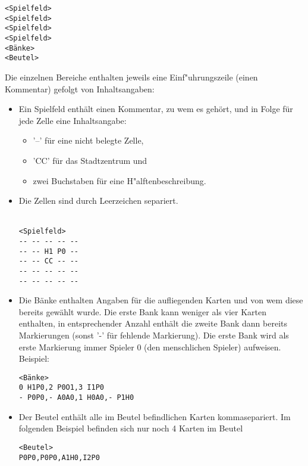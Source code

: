 \begin{addmargin}[50pt]{0pt}
\begin{samepage}
\verb|<Spielfeld>|
\\ \verb|<Spielfeld>|
\\ \verb|<Spielfeld>|
\\ \verb|<Spielfeld>|
\\ \verb|<Bänke>|
\\ \verb|<Beutel>|\\
\end{samepage}
\end{addmargin}

Die einzelnen Bereiche enthalten jeweils eine Einf"uhrungszeile (einen Kommentar) gefolgt von Inhaltsangaben:
\begin{itemize}
	\item Ein Spielfeld enthält einen Kommentar, zu wem es gehört, und in Folge für jede Zelle eine Inhaltsangabe:
	\begin{itemize}
		\item '--' für eine nicht belegte Zelle,
		\item 'CC' für das Stadtzentrum und
		\item zwei Buchstaben für eine H"alftenbeschreibung.
	\end{itemize}
	\item Die Zellen sind durch Leerzeichen separiert. \\ \newline {}\\
	\begin{addmargin}[50pt]{0pt}
	\verb|<Spielfeld>|
	\\ \verb|-- -- -- -- --|
	\\ \verb|-- -- H1 P0 --|
	\\ \verb|-- -- CC -- --|
	\\ \verb|-- -- -- -- --|
	\\ \verb|-- -- -- -- --|\\
	\end{addmargin}
	\item Die Bänke enthalten Angaben für die aufliegenden Karten und von wem diese bereits gewählt wurde. Die erste Bank kann weniger als vier Karten enthalten, in entsprechender Anzahl enthält die zweite Bank dann bereits Markierungen (sonst '-' für fehlende Markierung). Die erste Bank wird als erste Markierung immer Spieler 0 (den menschlichen Spieler) aufweisen. Beispiel:
	\begin{addmargin}[50pt]{0pt}
	\verb|<Bänke>|
  \\ \verb|0 H1P0,2 P0O1,3 I1P0|
  \\ \verb|- P0P0,- A0A0,1 H0A0,- P1H0|
  \end{addmargin}
  \item Der Beutel enthält alle im Beutel befindlichen Karten kommasepariert. Im folgenden Beispiel befinden sich nur noch 4 Karten im Beutel
  \begin{addmargin}[50pt]{0pt}
  \verb|<Beutel>|
  \\ \verb|P0P0,P0P0,A1H0,I2P0|
  \end{addmargin}
\end{itemize}

